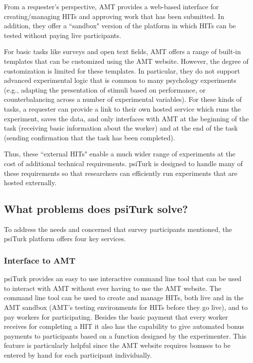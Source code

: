 \documentclass[twocolumn]{svjour3}          %
\begin{document}
From a requester's perspective, AMT provides a web-based interface for creating/managing HITs and approving work that has been submitted.
In addition, they offer a ``sandbox" version of the platform in which HITs can be tested without paying live participants.

For basic tasks like surveys and open text fields, AMT offers a range of built-in templates that can be customized using the AMT website.
However, the degree of customization is limited for these templates. 
In particular, they do not support advanced experimental logic that is common to many psychology experiments (e.g., adapting the presentation of stimuli based on performance, or counterbalancing across a number of experimental variables).
For these kinds of tasks, a requester can provide a link to their own hosted service which runs the experiment, saves the data, and only interfaces with AMT at the beginning of the task (receiving basic information about the worker) and at the end of the task (sending confirmation that the task has been completed).

Thus, these ``external HITs" enable a much wider range of experiments at the cost of additional technical requirements.
psiTurk is designed to handle many of these requirements so that researchers can efficiently run experiments that are hosted externally.


\subsection{What problems does psiTurk solve?}
To address the needs and concerned that survey participants mentioned, the psiTurk platform
 offers four key services.


\subsubsection{Interface to AMT}
psiTurk provides an easy to use interactive command line tool that can be used to 
interact with AMT without ever having to use the AMT website.  
The command line tool can be used to create and manage HITs, both live and in the AMT sandbox 
(AMT's testing environments for HITs before they go live), and to pay workers for
participating. Besides the basic payment that every worker receives for completing a HIT
it also has the capability to give automated bonus payments to participants based on a function
designed by the experimenter. This feature is particularly helpful since the AMT website
requires bonuses to be entered by hand for each participant individually.
\end{document}
